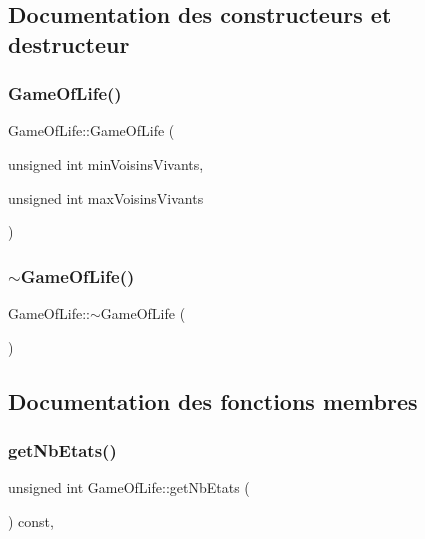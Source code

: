 \subsection{Documentation des constructeurs et destructeur}
\mbox{\label{class_game_of_life_a033f778ad4b391bbf04dfa937f7b11df}} 
\subsubsection{\texorpdfstring{Game\+Of\+Life()}{GameOfLife()}}
{\footnotesize\ttfamily Game\+Of\+Life\+::\+Game\+Of\+Life (\begin{DoxyParamCaption}\item[{unsigned int}]{min\+Voisins\+Vivants,  }\item[{unsigned int}]{max\+Voisins\+Vivants }\end{DoxyParamCaption})\hspace{0.3cm}{\ttfamily [inline]}}

\mbox{\label{class_game_of_life_a3006eb8600b82f3deff3b8efe6725569}} 
\subsubsection{\texorpdfstring{$\sim$\+Game\+Of\+Life()}{~GameOfLife()}}
{\footnotesize\ttfamily Game\+Of\+Life\+::$\sim$\+Game\+Of\+Life (\begin{DoxyParamCaption}{ }\end{DoxyParamCaption})\hspace{0.3cm}{\ttfamily [default]}}



\subsection{Documentation des fonctions membres}
\mbox{\label{class_game_of_life_afb8e0ee780b7e187266060cf9bec0578}} 
\subsubsection{\texorpdfstring{get\+Nb\+Etats()}{getNbEtats()}}
{\footnotesize\ttfamily unsigned int Game\+Of\+Life\+::get\+Nb\+Etats (\begin{DoxyParamCaption}{ }\end{DoxyParamCaption}) const\hspace{0.3cm}{\ttfamily [inline]}, {\ttfamily [virtual]}}



